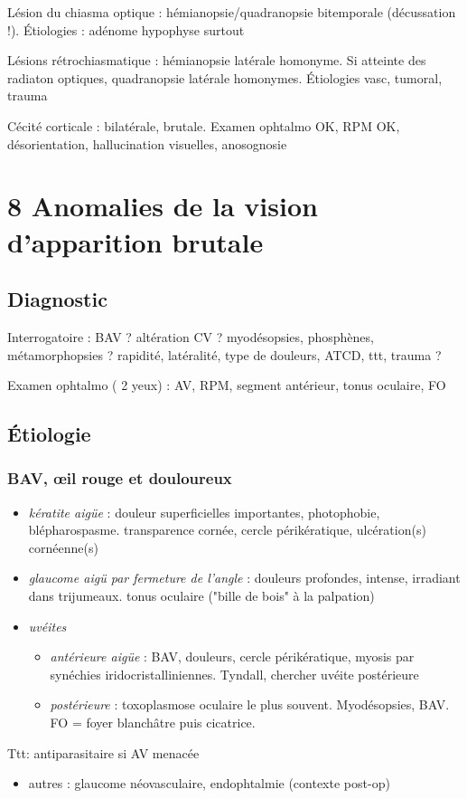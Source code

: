\documentclass[11pt]{article}
\def\ttt{\hspace*{1cm}Ttt: }
\begin{document}
Lésion du chiasma optique : hémianopsie/quadranopsie bitemporale (décussation
!). Étiologies : adénome hypophyse surtout

Lésions rétrochiasmatique : hémianopsie latérale homonyme. Si atteinte des
radiaton optiques, quadranopsie latérale homonymes. Étiologies vasc, tumoral,
trauma

Cécité corticale : bilatérale, brutale. Examen ophtalmo OK, RPM OK,
désorientation, hallucination visuelles, anosognosie
\section{8 Anomalies de la vision d'apparition brutale}
\label{sec:org72ba9b8}
\subsection{Diagnostic}
\label{sec:org3e5d0ef}
Interrogatoire : BAV ? altération CV ? myodésopsies,  phosphènes,
métamorphopsies ? rapidité, latéralité, type de douleurs, ATCD, ttt, trauma ?

Examen ophtalmo ( 2 yeux) : AV, RPM, segment antérieur, tonus oculaire, FO

\subsection{Étiologie}
\label{sec:org8a274f1}
\subsubsection{BAV, \oe{}il rouge et douloureux}
\label{sec:org72247a3}
\begin{itemize}
\item \emph{kératite aigüe} : douleur superficielles importantes, photophobie,
blépharospasme. \dec transparence cornée, cercle périkératique, ulcération(s)
cornéenne(s)
\item \emph{glaucome aigü par fermeture de l'angle} : douleurs profondes, intense,
irradiant dans trijumeaux. \inc\inc tonus oculaire ("bille de bois" à la
palpation)
\item \emph{uvéites}
\begin{itemize}
\item \emph{antérieure aigüe} : BAV, douleurs, cercle périkératique, myosis par synéchies
iridocristalliniennes. Tyndall, chercher uvéite postérieure
\item \emph{postérieure} : toxoplasmose oculaire le plus souvent. Myodésopsies, BAV. FO =
foyer blanchâtre puis cicatrice. \\
\end{itemize}
\end{itemize}
\ttt antiparasitaire si AV menacée
\begin{itemize}
\item autres  : glaucome néovasculaire, endophtalmie (contexte post-op)
\end{itemize}
\end{document}
